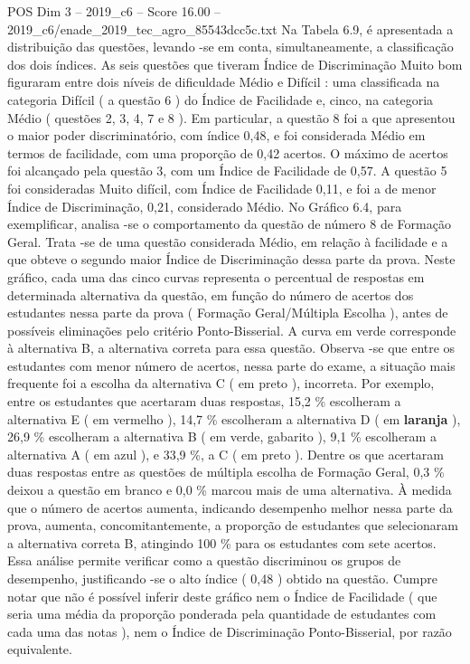 \begin{textsample}{POS Dim 3 – 2019\_c6 – Score 16.00 – 2019\_c6/enade\_2019\_tec\_agro\_85543dcc5c.txt}
Na Tabela 6.9, é apresentada a distribuição das questões, levando -se em conta, simultaneamente, a classificação dos dois índices.
As seis questões que tiveram Índice de Discriminação Muito bom figuraram entre dois níveis de dificuldade Médio e Difícil : uma classificada na categoria Difícil ( a questão 6 ) do Índice de Facilidade e, cinco, na categoria Médio ( questões 2, 3, 4, 7 e 8 ).
Em particular, a questão 8 foi a que apresentou o maior poder discriminatório, com índice 0,48, e foi considerada Médio em termos de facilidade, com uma proporção de 0,42 acertos.
O máximo de acertos foi alcançado pela questão 3, com um Índice de Facilidade de 0,57.
A questão 5 foi consideradas Muito difícil, com Índice de Facilidade 0,11, e foi a de menor Índice de Discriminação, 0,21, considerado Médio.
No Gráfico 6.4, para exemplificar, analisa -se o comportamento da questão de número 8 de Formação Geral.
Trata -se de uma questão considerada Médio, em relação à facilidade e a que obteve o segundo maior Índice de Discriminação dessa parte da prova.
Neste gráfico, cada uma das cinco curvas representa o percentual de respostas em determinada alternativa da questão, em função do número de acertos dos estudantes nessa parte da prova ( Formação Geral/Múltipla Escolha ), antes de possíveis eliminações pelo critério Ponto-Bisserial.
A curva em verde corresponde à alternativa B, a alternativa correta para essa questão.
Observa -se que entre os estudantes com menor número de acertos, nessa parte do exame, a situação mais frequente foi a escolha da alternativa C ( em preto ), incorreta.
Por exemplo, entre os estudantes que acertaram duas respostas, 15,2 \% escolheram a alternativa E ( em vermelho ), 14,7 \% escolheram a alternativa D ( em \textbf{laranja} ), 26,9 \% escolheram a alternativa B ( em verde, gabarito ), 9,1 \% escolheram a alternativa A ( em azul ), e 33,9 \%, a C ( em preto ).
Dentre os que acertaram duas respostas entre as questões de múltipla escolha de Formação Geral, 0,3 \% deixou a questão em branco e 0,0 \% marcou mais de uma alternativa.
À medida que o número de acertos aumenta, indicando desempenho melhor nessa parte da prova, aumenta, concomitantemente, a proporção de estudantes que selecionaram a alternativa correta B, atingindo 100 \% para os estudantes com sete acertos.
Essa análise permite verificar como a questão discriminou os grupos de desempenho, justificando -se o alto índice ( 0,48 ) obtido na questão.
Cumpre notar que não é possível inferir deste gráfico nem o Índice de Facilidade ( que seria uma média da proporção ponderada pela quantidade de estudantes com cada uma das notas ), nem o Índice de Discriminação Ponto-Bisserial, por razão equivalente.

\end{textsample}
